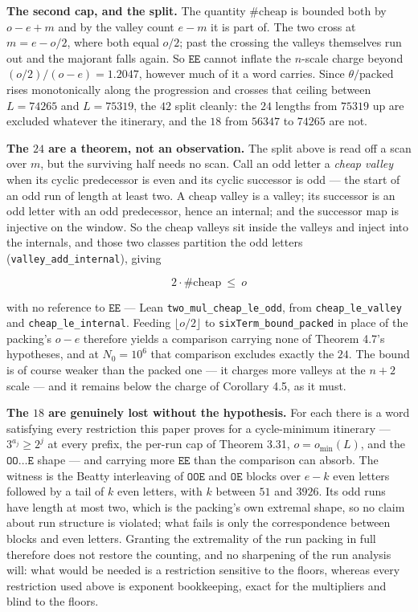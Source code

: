 \documentclass[12pt]{article}
\begin{document}
\textbf{The second cap, and the split.} The quantity \(\#\text{cheap}\)
is bounded both by \(o-e+m\) and by the valley count \(e-m\) it is part
of. The two cross at \(m=e-o/2\), where both equal \(o/2\); past the
crossing the valleys themselves run out and the majorant falls again. So
\(\mathtt{EE}\) cannot inflate the \(n\)-scale charge beyond
\((o/2)/(o-e)=1.2047\), however much of it a word carries. Since
\(\theta/\text{packed}\) rises monotonically along the progression and
crosses that ceiling between \(L=74265\) and \(L=75319\), the \(42\)
split cleanly: the \(24\) lengths from \(75319\) up are excluded
whatever the itinerary, and the \(18\) from \(56347\) to \(74265\) are
not.

\textbf{The \(24\) are a theorem, not an observation.} The split above
is read off a scan over \(m\), but the surviving half needs no scan.
Call an odd letter a \emph{cheap valley} when its cyclic predecessor is
even and its cyclic successor is odd --- the start of an odd run of
length at least two. A cheap valley is a valley; its successor is an odd
letter with an odd predecessor, hence an internal; and the successor map
is injective on the window. So the cheap valleys sit inside the valleys
and inject into the internals, and those two classes partition the odd
letters (\texttt{\nolinkurl{valley_add_internal}}), giving

\[
2\cdot\#\text{cheap}\ \le\ o
\]

with no reference to \(\mathtt{EE}\) --- Lean
\texttt{\nolinkurl{two_mul_cheap_le_odd}}, from
\texttt{\nolinkurl{cheap_le_valley}} and
\texttt{\nolinkurl{cheap_le_internal}}. Feeding \(\lfloor o/2\rfloor\)
to \texttt{\nolinkurl{sixTerm_bound_packed}} in place of the packing's
\(o-e\) therefore yields a comparison carrying none of Theorem 4.7's
hypotheses, and at \(N_0=10^6\) that comparison excludes exactly the
\(24\). The bound is of course weaker than the packed one --- it charges
more valleys at the \(n+2\) scale --- and it remains below the charge of
Corollary 4.5, as it must.

\textbf{The \(18\) are genuinely lost without the hypothesis.} For each
there is a word satisfying every restriction this paper proves for a
cycle-minimum itinerary --- \(3^{a_j}\ge2^j\) at every prefix, the
per-run cap of Theorem 3.31, \(o=o_{\min}(L)\), and the
\(\mathtt{OO}\ldots\mathtt{E}\) shape --- and carrying more
\(\mathtt{EE}\) than the comparison can absorb. The witness is the
Beatty interleaving of \(\mathtt{OOE}\) and \(\mathtt{OE}\) blocks over
\(e-k\) even letters followed by a tail of \(k\) even letters, with
\(k\) between \(51\) and \(3926\). Its odd runs have length at most two,
which is the packing's own extremal shape, so no claim about run
structure is violated; what fails is only the correspondence between
blocks and even letters. Granting the extremality of the run packing in
full therefore does not restore the counting, and no sharpening of the
run analysis will: what would be needed is a restriction sensitive to
the floors, whereas every restriction used above is exponent
bookkeeping, exact for the multipliers and blind to the floors.
\end{document}
